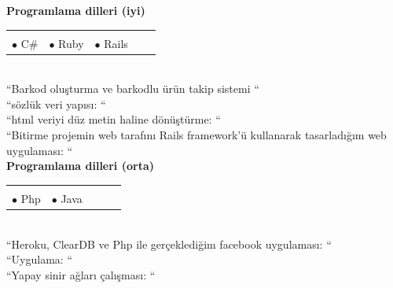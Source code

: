 \documentclass[10pt,a4paper]{article}
\begin{document}
{\bf Programlama dilleri (iyi)}\\
\hspace*{0.3in}\begin{tabular}{lrrrr}
\vspace{0.5 mm}\\
  $\bullet$ C$ \# $ &$\bullet$ Ruby &$\bullet$ Rails & &\\
\end{tabular}
\vspace{0.5 mm}\\
\hspace*{0.6in}\footnotesize{``Barkod oluşturma ve barkodlu ürün takip sistemi ``}\\
\hspace*{0.6in}\footnotesize{``sözlük veri yapısı: ``}\\
\hspace*{0.6in}\footnotesize{``html veriyi düz metin haline dönüştürme: ``}\\
\hspace*{0.6in}\footnotesize{``Bitirme projemin web tarafını Rails framework'ü kullanarak tasarladığım web uygulaması: ``}\\

{\bf Programlama dilleri (orta)}\\
\hspace*{0.3in}\begin{tabular}{lrrrr}
\vspace{0.5 mm}\\
  $\bullet$ Php &$\bullet$ Java & & &\\
\end{tabular}
\vspace{0.5 mm}\\
\hspace*{0.6in}\footnotesize{``Heroku, ClearDB ve Php ile gerçeklediğim facebook uygulaması: ``}\\
\hspace*{0.6in}\footnotesize{``Uygulama: ``}\\
\hspace*{0.6in}\footnotesize{``Yapay sinir ağları çalışması: ``}\\
\end{document}
